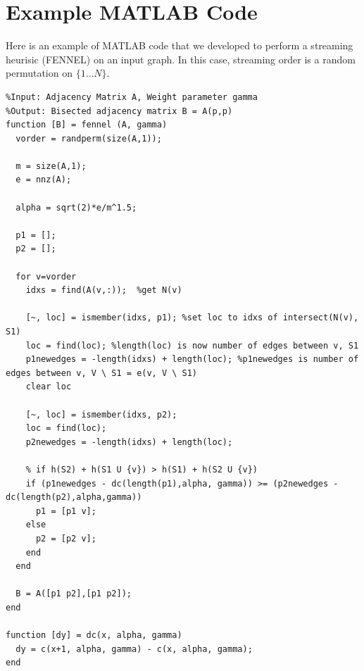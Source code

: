 \documentclass[11pt]{article}
\begin{document}
\section{Example MATLAB Code}
Here is an example of MATLAB code that we developed to perform a streaming heurisic (FENNEL) on an input graph. In this case, streaming order is a random permutation on $\{1\dots N\}$.
\begin{verbatim}
%Input: Adjacency Matrix A, Weight parameter gamma
%Output: Bisected adjacency matrix B = A(p,p)
function [B] = fennel (A, gamma)
  vorder = randperm(size(A,1));

  m = size(A,1);
  e = nnz(A);

  alpha = sqrt(2)*e/m^1.5;

  p1 = [];
  p2 = [];
  
  for v=vorder
    idxs = find(A(v,:));  %get N(v)

    [~, loc] = ismember(idxs, p1); %set loc to idxs of intersect(N(v), S1)
    loc = find(loc); %length(loc) is now number of edges between v, S1
    p1newedges = -length(idxs) + length(loc); %p1newedges is number of edges between v, V \ S1 = e(v, V \ S1)
    clear loc
    
    [~, loc] = ismember(idxs, p2);
    loc = find(loc);
    p2newedges = -length(idxs) + length(loc);

    % if h(S2) + h(S1 U {v}) > h(S1) + h(S2 U {v})
    if (p1newedges - dc(length(p1),alpha, gamma)) >= (p2newedges - dc(length(p2),alpha,gamma))
      p1 = [p1 v];
    else
      p2 = [p2 v];
    end
  end

  B = A([p1 p2],[p1 p2]); 
end

function [dy] = dc(x, alpha, gamma)
  dy = c(x+1, alpha, gamma) - c(x, alpha, gamma);
end
\end{verbatim}



\end{document}
